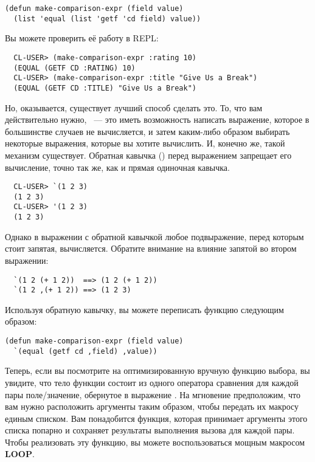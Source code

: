 \begin{lstlisting}
(defun make-comparison-expr (field value)
  (list 'equal (list 'getf 'cd field) value))
\end{lstlisting}

Вы можете проверить её работу в REPL:

\begin{verbatim}
  CL-USER> (make-comparison-expr :rating 10)
  (EQUAL (GETF CD :RATING) 10)
  CL-USER> (make-comparison-expr :title "Give Us a Break")
  (EQUAL (GETF CD :TITLE) "Give Us a Break")
\end{verbatim}

Но, оказывается, существует лучший способ сделать это. То, что вам действительно нужно,
~--- это иметь возможность написать выражение, которое в большинстве случаев не
вычисляется, и затем каким-либо образом выбирать некоторые выражения, которые вы хотите
вычислить. И, конечно же, такой механизм существует. Обратная кавычка () перед
выражением запрещает его вычисление, точно так же, как и прямая одиночная кавычка.

\begin{verbatim}
  CL-USER> `(1 2 3)
  (1 2 3)
  CL-USER> '(1 2 3)
  (1 2 3)
\end{verbatim}

Однако в выражении с обратной кавычкой любое подвыражение, перед которым стоит запятая,
вычисляется. Обратите внимание на влияние запятой во втором выражении:

\begin{verbatim}
  `(1 2 (+ 1 2))  ==> (1 2 (+ 1 2))
  `(1 2 ,(+ 1 2)) ==> (1 2 3)
\end{verbatim}

Используя обратную кавычку, вы можете переписать функцию  следующим образом:

\begin{lstlisting}
(defun make-comparison-expr (field value)
  `(equal (getf cd ,field) ,value))
\end{lstlisting}

Теперь, если вы посмотрите на оптимизированную вручную функцию выбора, вы увидите, что
тело функции состоит из одного оператора сравнения для каждой пары поле/значение,
обернутое в выражение . На мгновение предположим, что вам нужно расположить
аргументы таким образом, чтобы передать их макросу  единым списком. Вам
понадобится функция, которая принимает аргументы этого списка попарно и сохраняет
результаты выполнения вызова  для каждой пары. Чтобы
реализовать эту функцию, вы можете воспользоваться мощным макросом \textbf{LOOP}.


